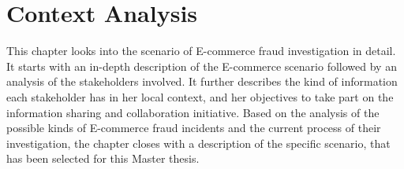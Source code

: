 
\chapter{Context Analysis} %
\label{cha:context_analysis}

This chapter looks into the scenario of E-commerce fraud investigation in detail. It starts with an in-depth description of the E-commerce scenario followed by an analysis of the stakeholders involved. It further describes the kind of information each stakeholder has in her local context, and her objectives to take part on the information sharing and collaboration initiative. Based on the analysis of the possible kinds of E-commerce fraud incidents and the current process of their investigation, the chapter closes with a description of the specific scenario, that has been selected for this Master thesis.











